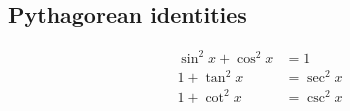 \subsection*{Pythagorean identities}

\begin{align*}
  \sin^2 x + \cos^2 x &= 1\\
  1 + \tan^2 x &= \sec^2 x\\
  1 + \cot^2 x &= \csc^2 x
\end{align*}